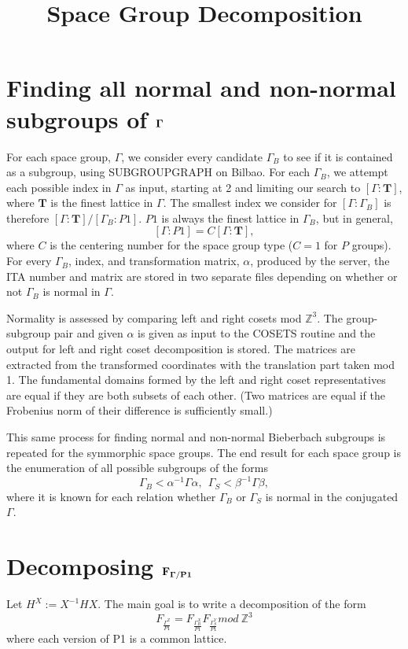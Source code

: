 \documentclass[12pt]{amsart}
\theoremstyle{definition}
\theoremstyle{remark}
\numberwithin{equation}{section}
\begin{document}
\title[]{Space Group Decomposition}

\maketitle

\section{{\bf Finding all normal and non-normal subgroups of $\bf \Gamma$}}
For each space group, $\Gamma$, we consider every candidate $\Gamma_{B}$ to see if it is contained as a subgroup, using SUBGROUPGRAPH on Bilbao.  For each $\Gamma_{B}$, we attempt each possible index in $\Gamma$ as input, starting at 2 and limiting our search to $[\Gamma :\mathbf{T}]$, where $\mathbf{T}$ is the finest lattice in $\Gamma$. The smallest index we consider for $[\Gamma :\Gamma_{B}]$ is therefore $[\Gamma :\mathbf{T}] / [\Gamma_{B} :P1]$.  $P1$ is always the finest lattice in $\Gamma_{B}$, but in general, 
\[
    [\Gamma :P1] = C [\Gamma :\mathbf{T}],
\]
where $C$ is the centering number for the space group type ($C=1$ for $P$ groups).  For every $\Gamma_{B}$, index, and transformation matrix, $\alpha$, produced by the server, the ITA number and matrix are stored in two separate files depending on whether or not $\Gamma_{B}$ is normal in $\Gamma$.  

Normality is assessed by comparing left and right cosets mod $\mathbb{Z}^3$.  The group-subgroup pair and given $\alpha$ is given as input to the COSETS routine and the output for left and right coset decomposition is stored.  The matrices are extracted from the transformed coordinates with the translation part taken mod 1. The fundamental domains formed by the left and right coset representatives are equal if they are both subsets of each other.  (Two matrices are equal if the Frobenius norm of their difference is sufficiently small.)

This same process for finding normal and non-normal Bieberbach subgroups is repeated for the symmorphic space groups.  The end result for each space group is the enumeration of all possible subgroups of the forms
\[
    \Gamma_{B} < \alpha^{-1} \Gamma \alpha, \ \ \Gamma_{S} < \beta^{-1} \Gamma \beta,
\]
where it is known for each relation whether $\Gamma_{B}$ or $\Gamma_{S}$ is normal in the conjugated $\Gamma$.

\section{\bf Decomposing $\bf F_{\Gamma/P1}$}
Let $H^{X}:=X^{-1}H X $. The main goal is to write a decomposition of the form
\[
    F_{\frac{\Gamma^{Z}}{P1}} = F_{\frac{\Gamma_{B}^{X}}{P1}} F_{\frac{\Gamma_{S}^{Y}}{P1}} mod \ \mathbb{Z}^3
\]
where each version of P1 is a common lattice.
\end{document}
